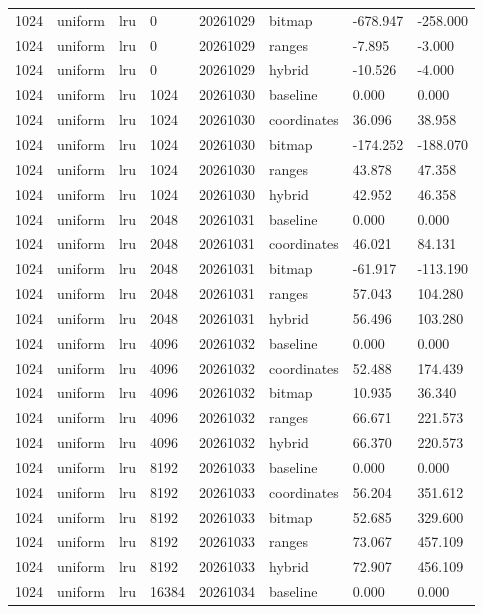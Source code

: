 \begin{tabular}{llllllll}
1024 & uniform & lru & 0 & 20261029 & bitmap & -678.947 & -258.000 \\
1024 & uniform & lru & 0 & 20261029 & ranges & -7.895 & -3.000 \\
1024 & uniform & lru & 0 & 20261029 & hybrid & -10.526 & -4.000 \\
1024 & uniform & lru & 1024 & 20261030 & baseline & 0.000 & 0.000 \\
1024 & uniform & lru & 1024 & 20261030 & coordinates & 36.096 & 38.958 \\
1024 & uniform & lru & 1024 & 20261030 & bitmap & -174.252 & -188.070 \\
1024 & uniform & lru & 1024 & 20261030 & ranges & 43.878 & 47.358 \\
1024 & uniform & lru & 1024 & 20261030 & hybrid & 42.952 & 46.358 \\
1024 & uniform & lru & 2048 & 20261031 & baseline & 0.000 & 0.000 \\
1024 & uniform & lru & 2048 & 20261031 & coordinates & 46.021 & 84.131 \\
1024 & uniform & lru & 2048 & 20261031 & bitmap & -61.917 & -113.190 \\
1024 & uniform & lru & 2048 & 20261031 & ranges & 57.043 & 104.280 \\
1024 & uniform & lru & 2048 & 20261031 & hybrid & 56.496 & 103.280 \\
1024 & uniform & lru & 4096 & 20261032 & baseline & 0.000 & 0.000 \\
1024 & uniform & lru & 4096 & 20261032 & coordinates & 52.488 & 174.439 \\
1024 & uniform & lru & 4096 & 20261032 & bitmap & 10.935 & 36.340 \\
1024 & uniform & lru & 4096 & 20261032 & ranges & 66.671 & 221.573 \\
1024 & uniform & lru & 4096 & 20261032 & hybrid & 66.370 & 220.573 \\
1024 & uniform & lru & 8192 & 20261033 & baseline & 0.000 & 0.000 \\
1024 & uniform & lru & 8192 & 20261033 & coordinates & 56.204 & 351.612 \\
1024 & uniform & lru & 8192 & 20261033 & bitmap & 52.685 & 329.600 \\
1024 & uniform & lru & 8192 & 20261033 & ranges & 73.067 & 457.109 \\
1024 & uniform & lru & 8192 & 20261033 & hybrid & 72.907 & 456.109 \\
1024 & uniform & lru & 16384 & 20261034 & baseline & 0.000 & 0.000 \\

\end{tabular}
